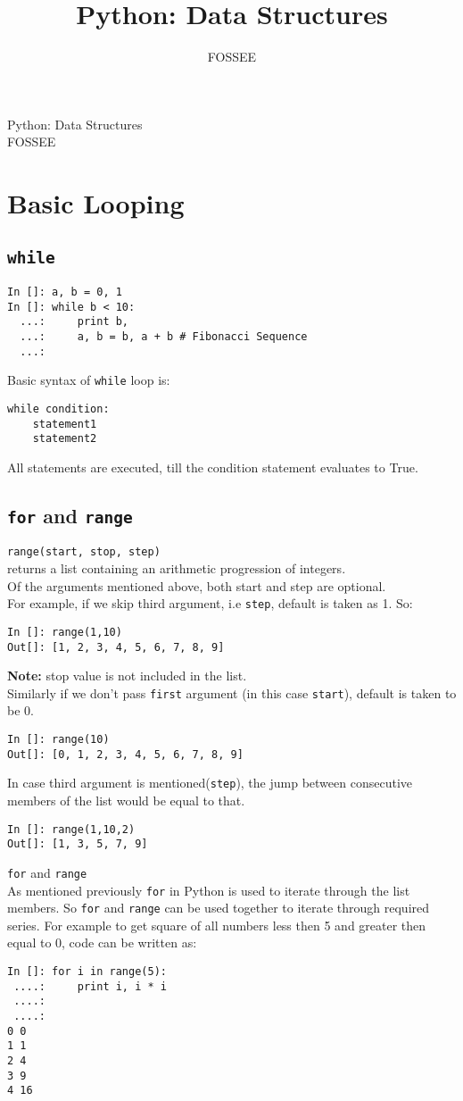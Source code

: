 \documentclass[12pt]{article}
\title{Python: Data Structures}
\author{FOSSEE}
\newcommand{\typ}[1]{\lstinline{#1}}
\begin{document}
\date{}
\vspace{-1in}
\begin{center}
\LARGE{Python: Data Structures}\\
\large{FOSSEE}
\end{center}
\section{Basic Looping}
\subsection{\typ{while}}
  \begin{lstlisting}
In []: a, b = 0, 1
In []: while b < 10:  
  ...:     print b,
  ...:     a, b = b, a + b # Fibonacci Sequence
  ...:
\end{lstlisting}
Basic syntax of \typ{while} loop is:
\begin{lstlisting}
while condition:
    statement1
    statement2
\end{lstlisting}
All statements are executed, till the condition statement evaluates to True.
\subsection{\typ{for} and \typ{range}}
\typ{range(start, stop, step)}\\
returns a list containing an arithmetic progression of integers.\\
Of the arguments mentioned above, both start and step are optional.\\
For example, if we skip third argument, i.e \typ{step}, default is taken as 1. So:
\begin{lstlisting}
In []: range(1,10)
Out[]: [1, 2, 3, 4, 5, 6, 7, 8, 9]
\end{lstlisting}
\textbf{Note:} stop value is not included in the list.\\
Similarly if we don't pass \typ{first} argument (in this case \typ{start}), default is taken to be 0.
\begin{lstlisting}
In []: range(10)
Out[]: [0, 1, 2, 3, 4, 5, 6, 7, 8, 9]
\end{lstlisting}
In case third argument is mentioned(\typ{step}), the jump between consecutive members of the list would be equal to that.
\begin{lstlisting}
In []: range(1,10,2)
Out[]: [1, 3, 5, 7, 9]
\end{lstlisting}
\typ{for} and \typ{range}\\
As mentioned previously \typ{for} in Python is used to iterate through the list members. So \typ{for} and \typ{range} can be used together to iterate through required series. For example to get square of all numbers less then 5 and greater then equal to 0, code can be written as:
\begin{lstlisting}
In []: for i in range(5):
 ....:     print i, i * i
 ....:
 ....:
0 0
1 1
2 4
3 9
4 16
\end{lstlisting}
\end{document}
